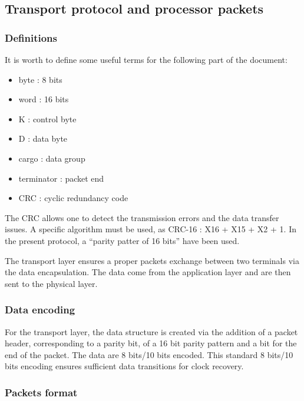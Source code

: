 \subsection{Transport protocol and processor packets}\label{chapappA::subsec::transport}

\subsubsection{Definitions}\label{chapappA::subsubsec::transpDefs}
	It is worth to define some useful terms for the following part of the document:

	\begin{itemize}
		\item byte : 8 bits
		\item word : 16 bits
		\item K : control byte
		\item D : data byte
		\item cargo : data group
		\item terminator : packet end
		\item CRC : cyclic redundancy code \newline
	\end{itemize}

The CRC allows one to detect the transmission errors and the data transfer issues. A specific algorithm must be used, as CRC-16 : X16 + X15 + X2 + 1. In the present protocol, a \enquote{parity patter of 16 bits} have been used.

The transport layer ensures a proper packets exchange between two terminals via the data encapsulation. The data come from the application layer and are then sent to the physical layer.\newline

\subsubsection{Data encoding}\label{chapappA::subsubsec::transpDataDec}
For the transport layer, the data structure is created via the addition of a packet header, corresponding to a parity bit, of a 16 bit parity pattern and a bit for the end of the packet.
The data are 8 bits/10 bits encoded. This standard 8 bits/10 bits encoding ensures sufficient data transitions for clock recovery.

\subsubsection{Packets format}\label{chapappA::subsubsec::transpPackForm}

